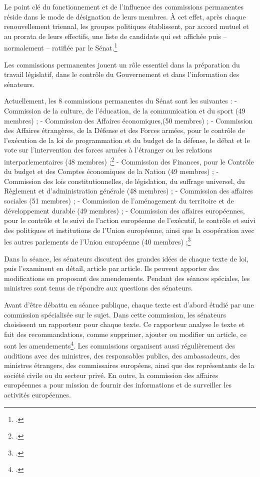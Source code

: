 Le point clé du fonctionnement et de l’influence des commissions permanentes réside dans le mode de désignation de leurs membres. À cet effet, après chaque renouvellement triennal, les groupes politiques établissent, par accord mutuel et au prorata de leurs effectifs, une liste de candidats qui est affichée puis – normalement – ratifiée par le Sénat.\footcite{Recueildefichesdusenat}

Les commissions permanentes jouent un rôle essentiel dans la préparation du travail législatif, dans le contrôle du Gouvernement et dans l’information des sénateurs.

Actuellement, les 8 commissions permanentes du Sénat sont les suivantes :
- Commission de la culture, de l’éducation, de la communication et du sport (49 membres) ;
- Commission des Affaires économiques,(50 membres) ;
- Commission des Affaires étrangères, de la Défense et des Forces armées, pour le contrôle de l’exécution de la loi de programmation et du budget de la défense, le débat et le vote sur l’intervention des forces armées à l’étranger ou les relations interparlementaires (48 membres) ;\footcite{fichecommissionaffairesetrangeres}
- Commission des Finances, pour le Contrôle du budget et des Comptes économiques de la Nation (49 membres) ;
- Commission des lois constitutionnelles, de législation, du suffrage universel, du Règlement et d'administration générale (48 membres) ;
- Commission des affaires sociales (51 membres) ;
- Commission de l'aménagement du territoire et de développement durable (49 membres) ;
- Commission des affaires européennes, pour le contrôle et le suivi de l'action européenne de l'exécutif, le contrôle et suivi des politiques et institutions de l'Union européenne, ainsi que la coopération avec les autres parlements de l'Union européenne (40 membres) ;\footcite{lescommissionspermanentes}

Dans la séance, les sénateurs discutent des grandes idées de chaque texte de loi, puis l'examinent en détail, article par article. Ils peuvent apporter des modifications en proposant des amendements. Pendant des séances spéciales, les ministres sont tenus de répondre aux questions des sénateurs.

Avant d'être débattu en séance publique, chaque texte est d'abord étudié par une commission spécialisée sur le sujet. Dans cette commission, les sénateurs choisissent un rapporteur pour chaque texte. Ce rapporteur analyse le texte et fait des recommandations, comme supprimer, ajouter ou modifier un article, ce sont les amendements\footcite{lescommissionspermanentes}. Les commissions organisent aussi régulièrement des auditions avec des ministres, des responsables publics, des ambassadeurs, des ministres étrangers, des commissaires européens, ainsi que des représentants de la société civile ou du secteur privé. En outre, la commission des affaires européennes a pour mission de fournir des informations et de surveiller les activités européennes.


